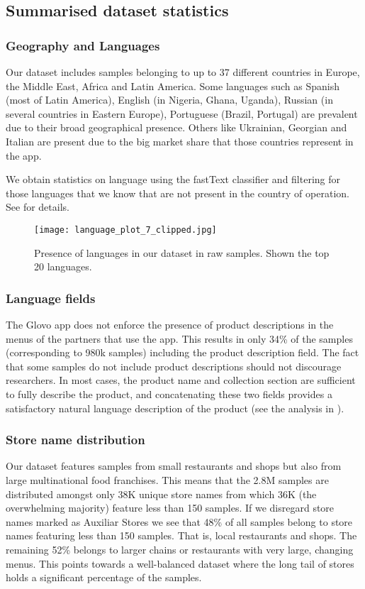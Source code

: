 \documentclass[10pt,twocolumn,letterpaper]{article}
\begin{document}
\subsection{Summarised dataset statistics}
\subsubsection{Geography and Languages}
Our dataset includes samples belonging to up to 37 different countries in Europe, the Middle East, Africa and Latin America. Some languages such as Spanish (most of Latin America), English (in Nigeria, Ghana, Uganda), Russian (in several countries in Eastern Europe), Portuguese (Brazil, Portugal) are prevalent due to their broad geographical presence. Others like Ukrainian, Georgian and Italian are present due to the big market share that those countries represent in the app. 

We obtain statistics on language using the fastText classifier \cite{joulin2016bag} and filtering for those languages that we know that are not present in the country of operation. See \cite{app_2021} for details.

\begin{figure*}[ht]
  \centering
    \texttt{[image: language\_plot\_7\_clipped.jpg]}
  \caption{Presence of languages in our dataset in raw samples. Shown the top 20 languages. \label{fig:language_presence}}
\end{figure*}

\subsubsection{Language fields}
The Glovo app does not enforce the presence of product descriptions in the menus of the partners that use the app. This results in only 34\% of the samples (corresponding to 980k samples) including the product description field. The fact that some samples do not include product descriptions should not discourage researchers. In most cases, the product name and collection section are sufficient to fully describe the product, and concatenating these two fields provides a satisfactory natural language description of the product (see the analysis in \cite{app_2021}).

\subsubsection{Store name distribution}
Our dataset features samples from small restaurants and shops but also from large multinational food franchises. This means that the 2.8M samples are distributed amongst only 38K unique store names from which 36K (the overwhelming majority) feature less than 150 samples. If we disregard store names marked as Auxiliar Stores we see that 48\% of all samples belong to store names featuring less than 150 samples. That is, local restaurants and shops. The remaining 52\% belongs to larger chains or restaurants with very large, changing menus. This points towards a well-balanced dataset where the long tail of stores holds a significant percentage of the samples. 
\end{document}
